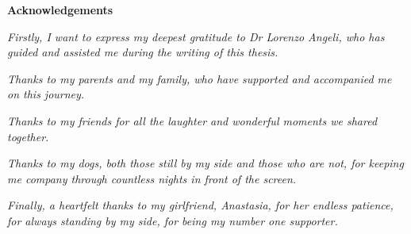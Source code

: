 \thispagestyle{empty}

\begin{center}
  {\bf \Huge Acknowledgements}
\end{center}

\vspace{4cm}


\emph{
Firstly, I want to express my deepest gratitude to Dr Lorenzo Angeli, who has guided and assisted me during the writing of this thesis.
}

\bigskip

\emph{
Thanks to my parents and my family, who have supported and accompanied me on this journey.
}

\bigskip

\emph{
Thanks to my friends for all the laughter and wonderful moments we shared together.
}

\bigskip

\emph{
Thanks to my dogs, both those still by my side and those who are not, for keeping me company through countless nights in front of the screen.
}

\bigskip

\emph{
Finally, a heartfelt thanks to my girlfriend, Anastasia, for her endless patience, for always standing by my side, for being my number one supporter.
}
